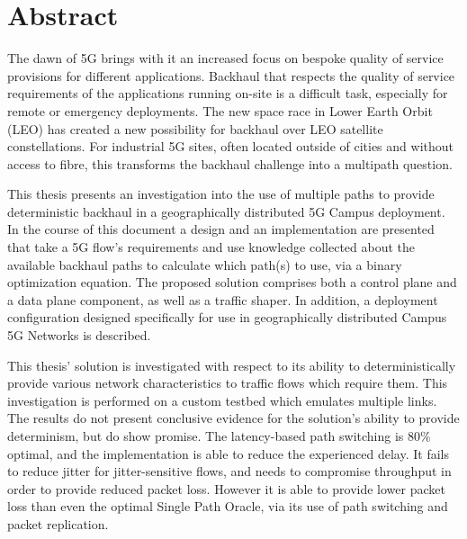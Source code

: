 
\cleardoublepage
{}
\section*{Abstract}

The dawn of 5G brings with it an increased focus on bespoke quality of service provisions for different applications. Backhaul that respects the quality of service requirements of the applications running on-site is a difficult task, especially for remote or emergency deployments. The new space race in Lower Earth Orbit (LEO) has created a new possibility for backhaul over LEO satellite constellations. For industrial 5G sites, often located outside of cities and without access to fibre, this transforms the backhaul challenge into a multipath question.

This thesis presents an investigation into the use of multiple paths to provide deterministic backhaul in a geographically distributed 5G Campus deployment. In the course of this document a design and an implementation are presented that take a 5G flow's requirements and use knowledge collected about the available backhaul paths to calculate which path(s) to use, via a binary optimization equation. The proposed solution comprises both a control plane and a data plane component, as well as a traffic shaper. In addition, a deployment configuration designed specifically for use in geographically distributed Campus 5G Networks is described.

This thesis' solution is investigated with respect to its ability to deterministically provide various network characteristics to traffic flows which require them. This investigation is performed on a custom testbed which emulates multiple links. The results do not present conclusive evidence for the solution's ability to provide determinism, but do show promise. The latency-based path switching is 80\% optimal, and the implementation is able to reduce the experienced delay. It fails to reduce jitter for jitter-sensitive flows, and needs to compromise throughput in order to provide reduced packet loss. However it is able to provide lower packet loss than even the optimal Single Path Oracle, via its use of path switching and packet replication.


\cleardoublepage
{}
